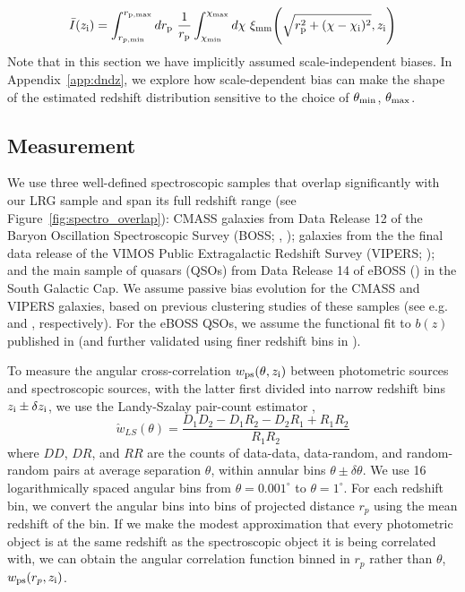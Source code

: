 \begin{equation}\label{Ibar_rp}
    \bar{I}(z_{\rm i}) = \int_{r_{p,\rm min}}^{r_{\rm p, max}}dr_{\rm p} \ \frac{1}{r_{\rm p}} \int_{\chi_{\rm min}}^{\chi_{\rm max}}d\chi \ \xi_{\rm mm}{\Bigg (}\sqrt{r_{\rm p}^2 + (\chi-\chi_{\rm i})^2},z_{\rm i}{\Bigg )}
\end{equation}
Note that in this section we have implicitly assumed scale-independent biases. In Appendix~\ref{app:dndz}, we explore how scale-dependent bias can make the shape of the estimated redshift distribution sensitive to the choice of $\theta_{\rm min}$, $\theta_{\rm max}$.

\subsection{Measurement}

We use three well-defined spectroscopic samples that overlap significantly with our LRG sample and span its full redshift range (see Figure~\ref{fig:spectro_overlap}): CMASS galaxies from Data Release 12 of the Baryon Oscillation Spectroscopic Survey (BOSS; \citealt{Eisenstein11}, \citealt{BOSS13}); galaxies from the the final data release of the VIMOS Public Extragalactic Redshift Survey (VIPERS; \citealt{VIPERS18}); and the main sample of quasars (QSOs) from Data Release 14 of eBOSS (\citealt{Dawson++16}) in the South Galactic Cap. We assume passive bias evolution for the CMASS and VIPERS galaxies, based on previous clustering studies of these samples (see e.g. \citealt{Torres++16} and \citealt{Marulli++13}, respectively). For the eBOSS QSOs, we assume the functional fit to $b(z)$ published in \citealt{Laurent++17} (and further validated using finer redshift bins in \citealt{Krolewski19}).

To measure the angular cross-correlation $w_{\rm ps}(\theta, z_{\rm i})$ between photometric sources and spectroscopic sources, with the latter first divided into narrow redshift bins $z_{\rm i} \pm \delta z_{\rm i}$, we use the Landy-Szalay pair-count estimator \citep{LandySzalay93}, 
%
\begin{equation}\label{eqn:LSestimator}
\hat{w}_{LS}(\theta) = \frac{D_1D_2 - D_1R_2 - D_2R_1 + R_1R_2}{R_1R_2}
\end{equation}
%
where $DD$, $DR$, and $RR$ are the counts of data-data, data-random, and random-random pairs at average separation $\theta$, within annular bins $\theta \pm \delta\theta$. We use 16 logarithmically spaced angular bins from $\theta = 0.001^{\circ}$ to $\theta = 1^{\circ}$. For each redshift bin, we convert the angular bins into bins of projected distance $r_p$ using the mean redshift of the bin. If we make the modest approximation that every photometric object is at the same redshift as the spectroscopic object it is being correlated with, we can obtain the angular correlation function binned in $r_p$ rather than $\theta$, $w_{\rm ps}(r_p, z_{\rm i})$.  

